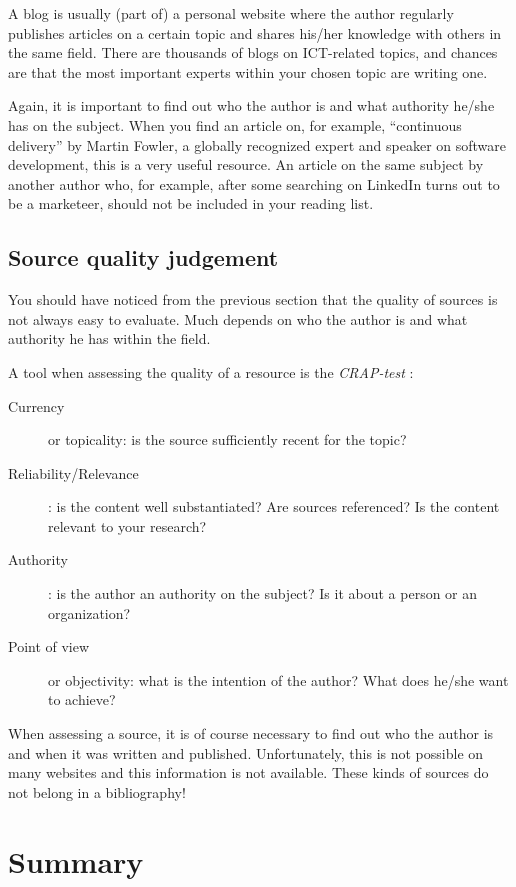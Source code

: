 A blog is usually (part of) a personal website where the author regularly publishes articles on a certain topic and shares his/her knowledge with others in the same field. There are thousands of blogs on ICT-related topics, and chances are that the most important experts within your chosen topic are writing one.

Again, it is important to find out who the author is and what authority he/she has on the subject. When you find an article on, for example, ``continuous delivery'' by Martin Fowler, a globally recognized expert and speaker on software development, this is a very useful resource. An article on the same subject by another author who, for example, after some searching on LinkedIn turns out to be a marketeer, should not be included in your reading list.

\subsection{Source quality judgement}
\label{sub:sourcequalityjudgement}

You should have noticed from the previous section that the quality of sources is not always easy to evaluate. Much depends on who the author is and what authority he has within the field.

A tool when assessing the quality of a resource is the \emph{CRAP-test} \autocite{Gratz2015}:

\begin{description}
   \item[Currency] or topicality: is the source sufficiently recent for the topic?
   \item[Reliability/Relevance]: is the content well substantiated? Are sources referenced? Is the content relevant to your research?
   \item[Authority]: is the author an authority on the subject? Is it about a person or an organization?
   \item[Point of view] or objectivity: what is the intention of the author? What does he/she want to achieve?
\end{description}

When assessing a source, it is of course necessary to find out who the author is and when it was written and published. Unfortunately, this is not possible on many websites and this information is not available. These kinds of sources do not belong in a bibliography!

\section{Summary}
\label{sec:literatureresearchsummary}


